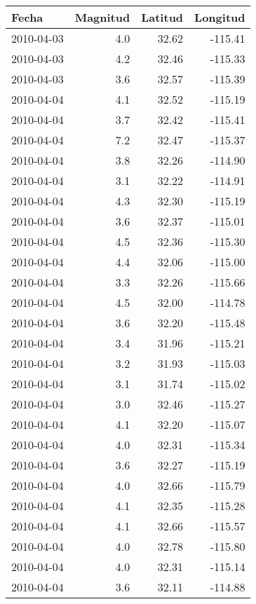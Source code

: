 \begin{tabular}{lrrr}
\toprule
     Fecha &  Magnitud &  Latitud &  Longitud \\
\midrule
2010-04-03 &       4.0 &    32.62 &   -115.41 \\
2010-04-03 &       4.2 &    32.46 &   -115.33 \\
2010-04-03 &       3.6 &    32.57 &   -115.39 \\
2010-04-04 &       4.1 &    32.52 &   -115.19 \\
2010-04-04 &       3.7 &    32.42 &   -115.41 \\
2010-04-04 &       7.2 &    32.47 &   -115.37 \\
2010-04-04 &       3.8 &    32.26 &   -114.90 \\
2010-04-04 &       3.1 &    32.22 &   -114.91 \\
2010-04-04 &       4.3 &    32.30 &   -115.19 \\
2010-04-04 &       3.6 &    32.37 &   -115.01 \\
2010-04-04 &       4.5 &    32.36 &   -115.30 \\
2010-04-04 &       4.4 &    32.06 &   -115.00 \\
2010-04-04 &       3.3 &    32.26 &   -115.66 \\
2010-04-04 &       4.5 &    32.00 &   -114.78 \\
2010-04-04 &       3.6 &    32.20 &   -115.48 \\
2010-04-04 &       3.4 &    31.96 &   -115.21 \\
2010-04-04 &       3.2 &    31.93 &   -115.03 \\
2010-04-04 &       3.1 &    31.74 &   -115.02 \\
2010-04-04 &       3.0 &    32.46 &   -115.27 \\
2010-04-04 &       4.1 &    32.20 &   -115.07 \\
2010-04-04 &       4.0 &    32.31 &   -115.34 \\
2010-04-04 &       3.6 &    32.27 &   -115.19 \\
2010-04-04 &       4.0 &    32.66 &   -115.79 \\
2010-04-04 &       4.1 &    32.35 &   -115.28 \\
2010-04-04 &       4.1 &    32.66 &   -115.57 \\
2010-04-04 &       4.0 &    32.78 &   -115.80 \\
2010-04-04 &       4.0 &    32.31 &   -115.14 \\
2010-04-04 &       3.6 &    32.11 &   -114.88 \\
\bottomrule
\end{tabular}
